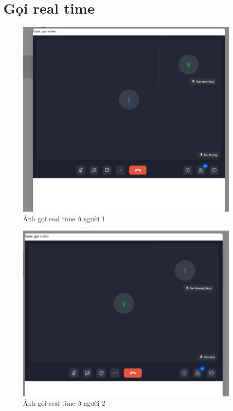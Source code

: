 \section{Gọi real time}
\begin{figure}[H]
    \centering
    \includegraphics[width=1\textwidth]{img/instagram/ảnh gọi người 1.png}
    \caption{Ảnh gọi real time ở người 1}
\end{figure}

\FloatBarrier %

\begin{figure}[H]
    \centering
    \includegraphics[width=1\textwidth]{img/instagram/ảnh gọi người 2.png}
    \caption{Ảnh gọi real time ở người 2}
\end{figure}

